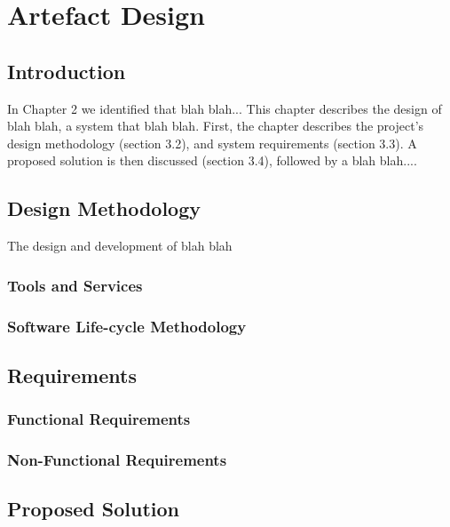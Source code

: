 \chapter{Artefact Design}

\section{Introduction} \label{a-d--introduction}

In Chapter 2 we identified that blah blah...
This chapter describes the design of blah blah, a system that blah blah.  First, the chapter describes the project’s design methodology (section 3.2), and system requirements (section 3.3).  A proposed solution is then discussed (section 3.4), followed by a blah blah....  


\section{Design Methodology} \label{a-d--methodology}

The design and development of blah blah

\subsection{Tools and Services} \label{a-d--methodology--tools}

\subsection{Software Life-cycle Methodology} \label{a-d--methodology--life-cycle}

\section{Requirements} \label{a-d--requirements}

\subsection{Functional Requirements} \label{a-d--requirements--functional}

\subsection{Non-Functional Requirements} \label{a-d--requirements--non-functional}

\section{Proposed Solution} \label{a-d--proposed-solution}

